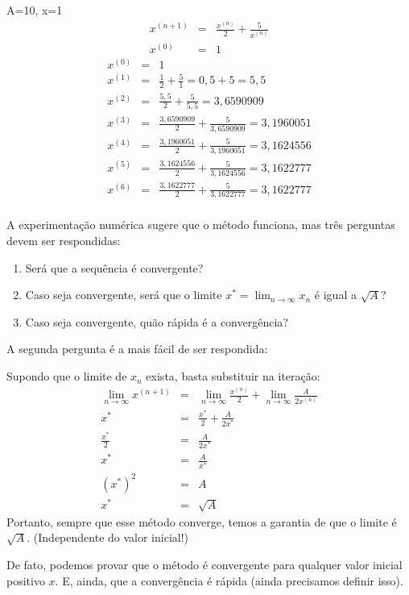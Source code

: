 \documentclass[main.tex]{subfiles}
\begin{document}
\begin{ex}
A=10, x=1
\begin{eqnarray*}
x^{(n+1)}&=&\frac{x^{(n)}}{2}+\frac{5}{x^{(n)}}\\
x^{(0)}&=&1
\end{eqnarray*}
\begin{eqnarray*}
x^{(0)}&=&1\\
x^{(1)}&=&\frac{1}{2}+\frac{5}{1}=0,5+5=5,5\\
x^{(2)}&=&\frac{5,5}{2}+\frac{5}{5,5}=3,6590909 \\
x^{(3)}&=&\frac{3,6590909}{2}+\frac{5}{3,6590909}=3,1960051   \\
x^{(4)}&=&\frac{3,1960051}{2}+\frac{5}{3,1960051}=3,1624556  \\
x^{(5)}&=&\frac{3,1624556}{2}+\frac{5}{3,1624556}=3,1622777  \\
x^{(6)}&=&\frac{3,1622777}{2}+\frac{5}{3,1622777}=3,1622777  \\
\end{eqnarray*}  
\end{ex}

A experimentação numérica sugere que o método funciona, mas três perguntas devem ser respondidas:
\begin{enumerate}
\item Será que a sequência é convergente?
\item Caso seja convergente, será que o limite $x^*=\lim_{n\to \infty }x_n$ é igual a $\sqrt{A}$?
\item Caso seja convergente, quão rápida é a convergência?
\end{enumerate}

A segunda pergunta é a mais fácil de ser respondida:

Supondo que o limite de $x_n$ exista, basta substituir na iteração:
\begin{eqnarray*}
\lim_{n \to \infty }x^{(n+1)}&=&\lim_{n \to \infty }\frac{x^{(n)}}{2}+\lim_{n \to \infty }\frac{A}{2x^{(n)}}\\
x^*&=&\frac{x^*}{2}+\frac{A}{2x^*}\\
\frac{x^*}{2}&=&\frac{A}{2x^*}\\
{x^*}&=&\frac{A}{x^*}\\
{(x^*)}^2&=&{A}\\
x^*&=&\sqrt{A}
\end{eqnarray*}
Portanto, sempre que esse método converge, temos a garantia de que o limite é $\sqrt{A}$. (Independente do valor inicial!)

De fato, podemos provar que o método é convergente para qualquer valor inicial positivo $x$. E, ainda, que a convergência é rápida (ainda precisamos definir isso).
\end{document}
